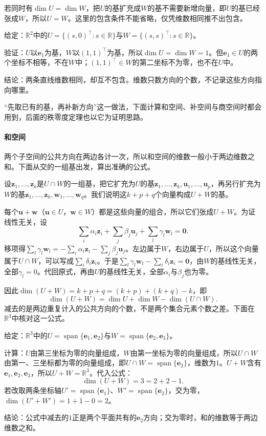 若同时有$\dim U=\dim W$，把$U$的基扩充成$W$的基不需要新增向量，即$U$的基已经张成$W$，所以$U=W$。这里的包含条件不能省略，仅凭维数相同推不出包含。
\begin{example}[反例：同维而互不包含的两条直线]
\label{ex:ls-equal-dimension-not-nested}
给定：$\mathbb R^2$中的$U=\{(s,0)^\top:s\in\mathbb R\}$与$W=\{(s,s)^\top:s\in\mathbb R\}$。

验证：$U$以$\bm e_1$为基，$W$以$(1,1)^\top$为基，所以$\dim U=\dim W=1$。但$\bm e_1\in U$的两个坐标不相等，不在$W$中；$(1,1)^\top\in W$的第二坐标不为零，也不在$U$中。

结论：两条直线维数相同，却互不包含。维数只数方向的个数，不记录这些方向指向哪里。
\end{example}
“先取已有的基，再补新方向”这一做法，下面计算和空间、补空间与商空间时都会用到，后面的秩零度定理也以它为证明思路。

\paragraph{和空间}
两个子空间的公共方向在两边各计一次，所以和空间的维数一般小于两边维数之和。下面从交的一组基出发，算出准确的公式。

设$\bm z_1,\ldots,\bm z_k$是$U\cap W$的一组基，把它扩充为$U$的基$\bm z_1,\ldots,\bm z_k,\bm u_1,\ldots,\bm u_p$，再另行扩充为$W$的基$\bm z_1,\ldots,\bm z_k,\bm w_1,\ldots,\bm w_q$。我们说明这$k+p+q$个向量构成$U+W$的基。

每个$\bm u+\bm w$（$\bm u\in U$，$\bm w\in W$）都是这些向量的组合，所以它们张成$U+W$。为证线性无关，设
\[
 \sum_i\alpha_i\bm z_i+\sum_j\beta_j\bm u_j+\sum_l\gamma_l\bm w_l=\bm0 .
\]
移项得$\sum_l\gamma_l\bm w_l=-\sum_i\alpha_i\bm z_i-\sum_j\beta_j\bm u_j$。左边属于$W$，右边属于$U$，所以这个向量属于$U\cap W$，可以写成$\sum_i\delta_i\bm z_i$。于是$\sum_l\gamma_l\bm w_l-\sum_i\delta_i\bm z_i=\bm0$，由$W$的基线性无关，全部$\gamma_l=0$。代回原式，再由$U$的基线性无关，全部$\alpha_i$与$\beta_j$也为零。

因此$\dim(U+W)=k+p+q=(k+p)+(k+q)-k$，即
\begin{equation}
 \dim(U+W)=\dim U+\dim W-\dim(U\cap W).
 \label{eq:ls-dimension-formula}
\end{equation}
减去的是两边重复计入的公共方向的个数，不是两个集合元素个数之差。下面在$\mathbb R^3$中核对这一公式。
\begin{example}[两个坐标平面的和]
\label{ex:ls-dimension-formula-planes}
给定：$\mathbb R^3$中的$U=\operatorname{span}\{\bm e_1,\bm e_2\}$与$W=\operatorname{span}\{\bm e_2,\bm e_3\}$。

计算：$U$由第三坐标为零的向量组成，$W$由第一坐标为零的向量组成，所以$U\cap W$由第一、三坐标都为零的向量组成，即$U\cap W=\operatorname{span}\{\bm e_2\}$，维数为$1$。$U+W$含有$\bm e_1,\bm e_2,\bm e_3$，所以$U+W=\mathbb R^3$。代入公式：
\[
 \dim(U+W)=3=2+2-1 .
\]
若改取两条坐标轴$U'=\operatorname{span}\{\bm e_1\}$、$W'=\operatorname{span}\{\bm e_2\}$，交为零，$\dim(U'+W')=1+1-0=2$。

结论：公式中减去的$1$正是两个平面共有的$\bm e_2$方向；交为零时，和的维数等于两边维数之和。
\end{example}

